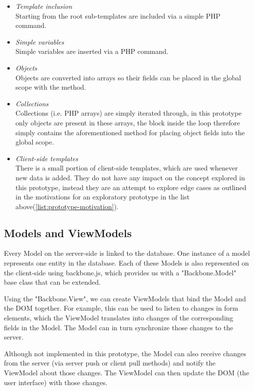 \begin{itemize}
	\item \emph{Template inclusion}\\
	Starting from the root sub-templates are included via a simple
	PHP  command.
	\item \emph{Simple variables}\\
	Simple variables are inserted via a PHP  command.
	\item \emph{Objects}\\
	Objects are converted into arrays so their fields can be placed in the global
	scope with the  method.
	\item \emph{Collections}\\
	Collections (i.e. PHP arrays) are simply iterated through, in this prototype
	only objects are present in these arrays, the block inside the
	 loop therefore simply contains the aforementioned method
	for placing object fields into the global scope.
	\item \emph{Client-side templates}\\
	There is a small portion of client-side templates, which are used whenever new
	data is added.  They do not have any impact on the concept explored in
	this prototype, instead they are an attempt to explore edge cases as outlined
	in the motivations for an exploratory prototype in the list
	above(\ref{list:prototype-motivation}).
\end{itemize}

\subsection{Models and ViewModels}
Every Model on the server-side is linked to the database.
One instance of a model represents one entity in the database.
Each of these Models is also represented on the client-side using backbone.js,
which provides us with a "Backbone.Model" base class that can be extended.

Using the "Backbone.View", we can create ViewModels that bind the Model and the
DOM together. For example, this can be used to listen to changes in
form elements, which the ViewModel translates into changes of the corresponding
fields in the Model. The Model can in turn synchronize those changes to the
server.

Although not implemented in this prototype, the Model can also receive changes
from the server (via server push or client pull methods) and notify
the ViewModel about those changes. The ViewModel can then update the
DOM (the user interface) with those changes.


